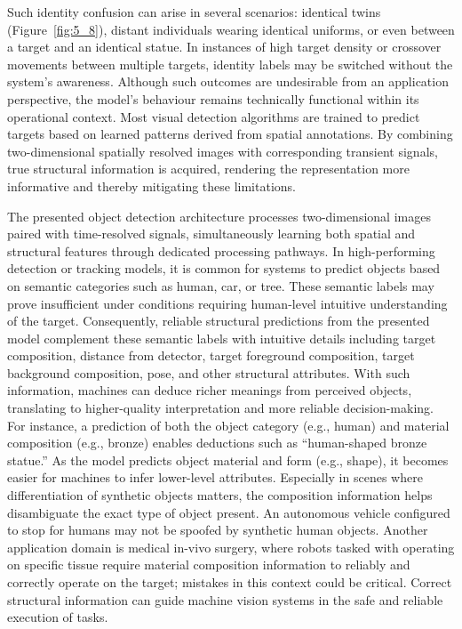 \documentclass[12pt,a4paper,oneside]{report}
\begin{document}
Such identity confusion can arise in several scenarios: identical twins (Figure~\ref{fig:5_8}), distant individuals wearing identical uniforms, or even between a target and an identical statue. In instances of high target density or crossover movements between multiple targets, identity labels may be switched without the system's awareness. Although such outcomes are undesirable from an application perspective, the model's behaviour remains technically functional within its operational context. Most visual detection algorithms are trained to predict targets based on learned patterns derived from spatial annotations. By combining two-dimensional spatially resolved images with corresponding transient signals, true structural information is acquired, rendering the representation more informative and thereby mitigating these limitations.

The presented object detection architecture processes two-dimensional images paired with time-resolved signals, simultaneously learning both spatial and structural features through dedicated processing pathways. In high-performing detection or tracking models, it is common for systems to predict objects based on semantic categories such as human, car, or tree. These semantic labels may prove insufficient under conditions requiring human-level intuitive understanding of the target. Consequently, reliable structural predictions from the presented model complement these semantic labels with intuitive details including target composition, distance from detector, target foreground composition, target background composition, pose, and other structural attributes. With such information, machines can deduce richer meanings from perceived objects, translating to higher-quality interpretation and more reliable decision-making. For instance, a prediction of both the object category (e.g., human) and material composition (e.g., bronze) enables deductions such as ``human-shaped bronze statue.'' As the model predicts object material and form (e.g., shape), it becomes easier for machines to infer lower-level attributes. Especially in scenes where differentiation of synthetic objects matters, the composition information helps disambiguate the exact type of object present. An autonomous vehicle configured to stop for humans may not be spoofed by synthetic human objects. Another application domain is medical in-vivo surgery, where robots tasked with operating on specific tissue require material composition information to reliably and correctly operate on the target; mistakes in this context could be critical. Correct structural information can guide machine vision systems in the safe and reliable execution of tasks.
\end{document}
